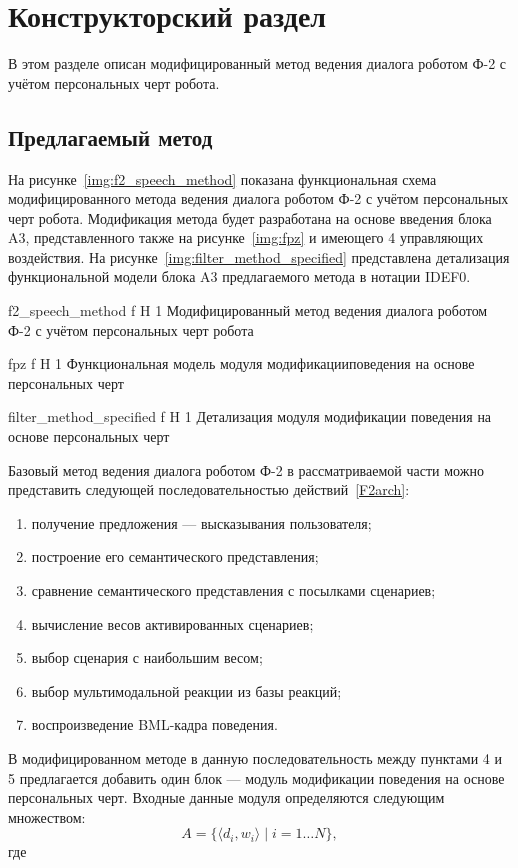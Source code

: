 \chapter{Конструкторский раздел}

В этом разделе описан модифицированный метод ведения диалога роботом Ф-2 с учётом персональных черт робота.

\section{Предлагаемый метод}

На рисунке~\ref{img:f2_speech_method} показана функциональная схема модифицированного метода ведения диалога роботом Ф-2 с учётом персональных черт робота. Модификация метода будет разработана на основе введения блока A3, представленного также
на рисунке~\ref{img:fpz} %
и имеющего 4 управляющих воздействия.
На рисунке~\ref{img:filter_method_specified} представлена детализация функциональной модели блока A3 предлагаемого метода в нотации IDEF0.

{f2_speech_method}
{f}
{H}
{1\textwidth}
{Модифицированный метод ведения диалога роботом Ф-2 с учётом персональных черт робота}

{fpz}
{f}
{H}
{1\textwidth}
{Функциональная модель модуля модификацииповедения на основе персональных черт}


{filter_method_specified}
{f}
{H}
{1\textwidth}
{Детализация модуля модификации поведения на основе персональных черт}

Базовый метод ведения диалога роботом Ф-2 в рассматриваемой части можно представить следующей последовательностью действий~\ref{F2arch}:
\begin{enumerate}
	\item получение предложения --- высказывания пользователя;
	\item построение его семантического представления;
	\item сравнение семантического представления с посылками сценариев;
	\item вычисление весов активированных сценариев;
	\item выбор сценария с наибольшим весом;
	\item выбор мультимодальной реакции из базы реакций;
	\item воспроизведение BML-кадра поведения.
\end{enumerate}

В модифицированном методе в данную последовательность между пунктами 4 и 5 предлагается добавить один блок --- модуль модификации поведения на основе персональных черт.
Входные данные модуля определяются следующим множеством:
\begin{equation}
	A = \{\langle d_i, w_i \rangle \mid i = 1 \dots N\},
\end{equation}
где

